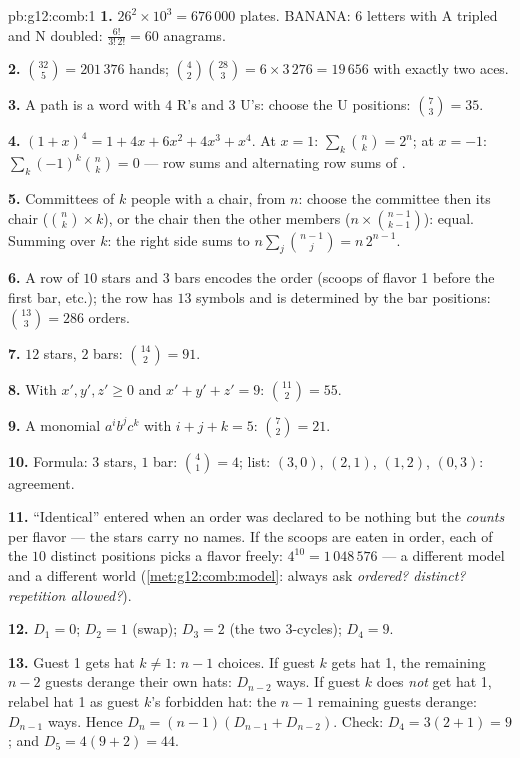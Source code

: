 \begin{solution}{pb:g12:comb:1}
\textbf{1.} $26^2 \times 10^3 = 676\,000$ plates. BANANA: $6$
letters with A tripled and N doubled:
$\frac{6!}{3!\,2!} = 60$ anagrams.

\textbf{2.} $\binom{32}{5} = 201\,376$ hands;
$\binom42 \binom{28}{3} = 6 \times 3\,276 = 19\,656$ with
exactly two aces.

\textbf{3.} A path is a word with $4$ R's and $3$ U's: choose
the U positions: $\binom73 = 35$.

\textbf{4.} $(1+x)^4 = 1 + 4x + 6x^2 + 4x^3 + x^4$. At
$x = 1$: $\sum_k \binom nk = 2^n$; at $x = -1$:
$\sum_k (-1)^k \binom nk = 0$ --- row sums and alternating row
sums of .

\textbf{5.} Committees of $k$ people with a chair, from $n$:
choose the committee then its chair ($\binom nk \times k$), or
the chair then the other members
($n \times \binom{n-1}{k-1}$): equal. Summing over $k$: the
right side sums to $n \sum_j \binom{n-1}{j} = n\,2^{n-1}$.

\textbf{6.} A row of $10$ stars and $3$ bars encodes the order
(scoops of flavor 1 before the first bar, etc.); the row has
$13$ symbols and is determined by the bar positions:
$\binom{13}{3} = 286$ orders.

\textbf{7.} $12$ stars, $2$ bars: $\binom{14}{2} = 91$.

\textbf{8.} With $x', y', z' \geq 0$ and
$x' + y' + z' = 9$: $\binom{11}{2} = 55$.

\textbf{9.} A monomial $a^i b^j c^k$ with $i + j + k = 5$:
$\binom72 = 21$.

\textbf{10.} Formula: $3$ stars, $1$ bar: $\binom41 = 4$;
list: $(3,0)$, $(2,1)$, $(1,2)$, $(0,3)$: agreement.

\textbf{11.} ``Identical'' entered when an order was declared
to be nothing but the \emph{counts} per flavor --- the stars
carry no names. If the scoops are eaten in order, each of the
$10$ distinct positions picks a flavor freely:
$4^{10} = 1\,048\,576$  --- a different model and a
different world (\cref{met:g12:comb:model}: always ask
\emph{ordered? distinct? repetition allowed?}).

\textbf{12.} $D_1 = 0$; $D_2 = 1$ (swap); $D_3 = 2$ (the two
$3$-cycles); $D_4 = 9$.

\textbf{13.} Guest 1 gets hat $k \neq 1$: $n - 1$ choices. If
guest $k$ gets hat 1, the remaining $n - 2$ guests derange
their own hats: $D_{n-2}$ ways. If guest $k$ does \emph{not}
get hat 1, relabel hat 1 as guest $k$'s forbidden hat: the
$n - 1$ remaining guests derange: $D_{n-1}$ ways. Hence
$D_n = (n-1)(D_{n-1} + D_{n-2})$. Check:
$D_4 = 3(2 + 1) = 9$; and $D_5 = 4(9 + 2) = 44$.


\end{solution}
